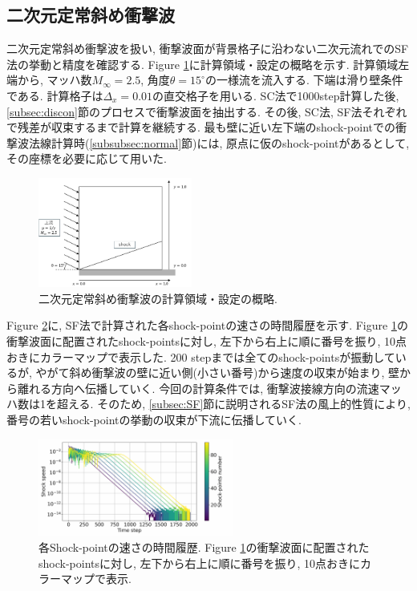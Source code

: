 \documentclass[a4j]{jarticle}
\begin{document}
\subsection{二次元定常斜め衝撃波}\label{subsec:2Ddiag}

二次元定常斜め衝撃波を扱い, 衝撃波面が背景格子に沿わない二次元流れでのSF法の挙動と精度を確認する.
Figure \ref{fig:2Ddiagsituation}に計算領域・設定の概略を示す.
計算領域左端から, マッハ数$M_\infty=2.5$, 角度$\theta=15^\circ$の一様流を流入する.
下端は滑り壁条件である. 
計算格子は$\Delta_x = 0.01$の直交格子を用いる. SC法で1000step計算した後, \ref{subsec:discon}節のプロセスで衝撃波面を抽出する.
その後, SC法, SF法それぞれで残差が収束するまで計算を継続する. 最も壁に近い左下端のshock-pointでの衝撃波法線計算時(\ref{subsubsec:normal}節)には,
原点に仮のshock-pointがあるとして, その座標を必要に応じて用いた.
\begin{figure}[H]
    \begin{center}
        \includegraphics[width=0.45\textwidth]{2Ddiagsituation.pdf}
    \end{center}
    \caption{二次元定常斜め衝撃波の計算領域・設定の概略.}
    \label{fig:2Ddiagsituation}
\end{figure}
Figure \ref{fig:2Ddiagconv}に, SF法で計算された各shock-pointの速さの時間履歴を示す.
Figure \ref{fig:2Ddiagsituation}の衝撃波面に配置されたshock-pointsに対し, 
左下から右上に順に番号を振り, 10点おきにカラーマップで表示した.
200 stepまでは全てのshock-pointsが振動しているが, やがて斜め衝撃波の壁に近い側(小さい番号)から速度の収束が始まり,
壁から離れる方向へ伝播していく.
今回の計算条件では, 衝撃波接線方向の流速マッハ数は1を超える.
そのため, \ref{subsec:SF}節に説明されるSF法の風上的性質により, 
番号の若いshock-pointの挙動の収束が下流に伝播していく.
\begin{figure}[h]
    \centering
    \hspace*{-8mm} %
    \includegraphics[width=0.57\textwidth]{2Ddiagconv.pdf}
    \caption{各Shock-pointの速さの時間履歴. Figure \ref{fig:2Ddiagsituation}の衝撃波面に配置されたshock-pointsに対し, 
左下から右上に順に番号を振り, 10点おきにカラーマップで表示.}
    \label{fig:2Ddiagconv}
\end{figure}
\end{document}
